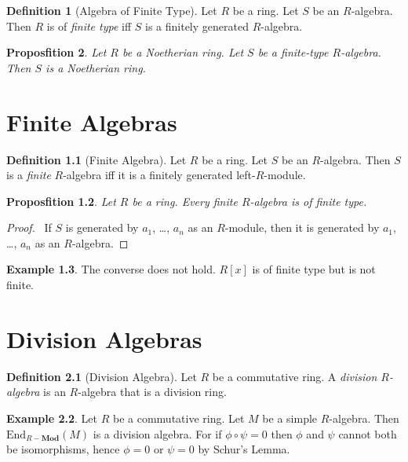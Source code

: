 \documentclass{book}
\let\qed\relax
\newtheorem{prop}{Proposfition}[chapter]
\theoremstyle{definition}
\newtheorem{df}[prop]{Definition}
\newtheorem{ex}[prop]{Example}
\newcommand{\End}[2]{\ensuremath{\mathrm{End}_{#1} \left( {#2} \right)}}
\newcommand{\Mod}[1]{\ensuremath{{#1}-\mathbf{Mod}}}
\begin{document}
\begin{df}[Algebra of Finite Type]
Let $R$ be a ring. Let $S$ be an $R$-algebra. Then $R$ is of \emph{finite type} iff $S$ is a finitely generated $R$-algebra.
\end{df}

\begin{prop}
Let $R$ be a Noetherian ring. Let $S$ be a finite-type $R$-algebra. Then $S$ is a Noetherian ring.
\end{prop}


\chapter{Finite Algebras}

\begin{df}[Finite Algebra]
Let $R$ be a ring. Let $S$ be an $R$-algebra. Then $S$ is a \emph{finite} $R$-algebra iff it is a finitely generated left-$R$-module.
\end{df}

\begin{prop}
Let $R$ be a ring. Every finite $R$-algebra is of finite type.
\end{prop}

\begin{proof}
\pf\ If $S$ is generated by $a_1$, \ldots, $a_n$ as an $R$-module, then it is generated by $a_1$, \ldots, $a_n$ as an $R$-algebra. \qed
\end{proof}

\begin{ex}
The converse does not hold. $R[x]$ is of finite type but is not finite.
\end{ex}

\chapter{Division Algebras}

\begin{df}[Division Algebra]
Let $R$ be a commutative ring.
A \emph{division $R$-algebra} is an $R$-algebra that is a division ring.
\end{df}

\begin{ex}
Let $R$ be a commutative ring. Let $M$ be a simple $R$-algebra. Then $\End{\Mod{R}}{M}$ is a division algebra. For if $\phi \circ \psi = 0$ then $\phi$ and $\psi$ cannot both be isomorphisms, hence $\phi = 0$ or $\psi = 0$ by Schur's Lemma.
\end{ex}
\end{document}
